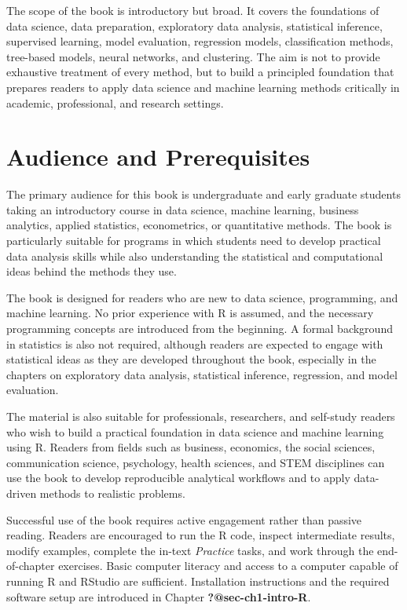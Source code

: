 \documentclass[
  letterpaper,
]{svmono}
\numberwithin{example}{subsection}
\begin{document}
The scope of the book is introductory but broad. It covers the
foundations of data science, data preparation, exploratory data
analysis, statistical inference, supervised learning, model evaluation,
regression models, classification methods, tree-based models, neural
networks, and clustering. The aim is not to provide exhaustive treatment
of every method, but to build a principled foundation that prepares
readers to apply data science and machine learning methods critically in
academic, professional, and research settings.

\section*{Audience and Prerequisites}\label{audience-and-prerequisites}


The primary audience for this book is undergraduate and early graduate
students taking an introductory course in data science, machine
learning, business analytics, applied statistics, econometrics, or
quantitative methods. The book is particularly suitable for programs in
which students need to develop practical data analysis skills while also
understanding the statistical and computational ideas behind the methods
they use.

The book is designed for readers who are new to data science,
programming, and machine learning. No prior experience with R is
assumed, and the necessary programming concepts are introduced from the
beginning. A formal background in statistics is also not required,
although readers are expected to engage with statistical ideas as they
are developed throughout the book, especially in the chapters on
exploratory data analysis, statistical inference, regression, and model
evaluation.

The material is also suitable for professionals, researchers, and
self-study readers who wish to build a practical foundation in data
science and machine learning using R. Readers from fields such as
business, economics, the social sciences, communication science,
psychology, health sciences, and STEM disciplines can use the book to
develop reproducible analytical workflows and to apply data-driven
methods to realistic problems.

Successful use of the book requires active engagement rather than
passive reading. Readers are encouraged to run the R code, inspect
intermediate results, modify examples, complete the in-text
\emph{Practice} tasks, and work through the end-of-chapter exercises.
Basic computer literacy and access to a computer capable of running R
and RStudio are sufficient. Installation instructions and the required
software setup are introduced in Chapter \textbf{?@sec-ch1-intro-R}.
\end{document}
